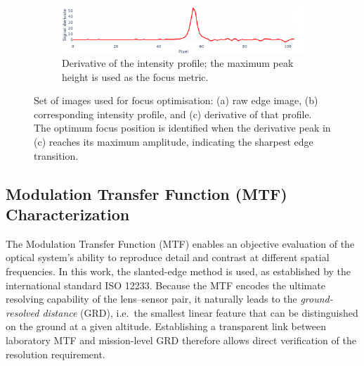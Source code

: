 \begin{figure}[H]
    \vspace{1em} %

    \begin{subfigure}[b]{0.95\linewidth}
        \centering
        \includegraphics[width=\linewidth]{Figures/C3/SE_diff.png}
        \caption{Derivative of the intensity profile; the maximum peak height is used as the focus metric.}
        \label{fig:se_diff}
    \end{subfigure}
    
    \caption{Set of images used for focus optimisation: (a) raw edge image, (b) corresponding intensity profile, and (c) derivative of that profile. The optimum focus position is identified when the derivative peak in (c) reaches its maximum amplitude, indicating the sharpest edge transition.}
    \label{fig:enfoque_conjunta}
\end{figure}


\subsection{Modulation Transfer Function (MTF) Characterization}
\label{sec:mtf_char}
\noindent The Modulation Transfer Function (MTF) enables an objective evaluation of the optical system’s ability to reproduce detail and contrast at different spatial frequencies. In this work, the slanted-edge method is used, as established by the international standard ISO 12233. Because the MTF encodes the ultimate resolving capability of the lens–sensor pair, it naturally leads to the \emph{ground-resolved distance} (GRD), i.e.\ the smallest linear feature that can be distinguished on the ground at a given altitude.  Establishing a transparent link between laboratory MTF and mission-level GRD therefore allows direct verification of the resolution requirement.\\




